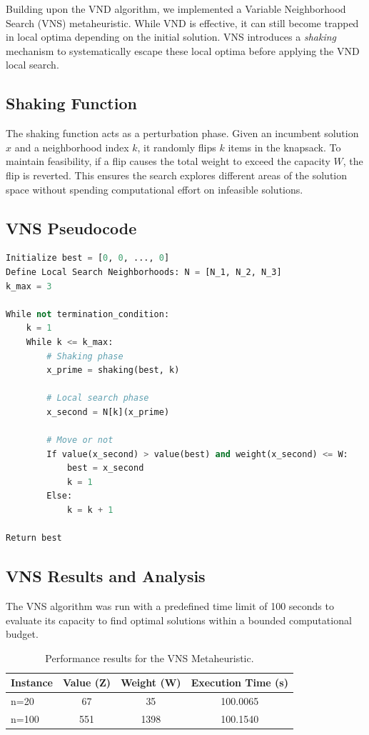 \documentclass[11pt,a4paper]{article}
\begin{document}
Building upon the VND algorithm, we implemented a Variable Neighborhood Search (VNS) metaheuristic. While VND is effective, it can still become trapped in local optima depending on the initial solution. VNS introduces a \textit{shaking} mechanism to systematically escape these local optima before applying the VND local search.

\subsection{Shaking Function}
The shaking function acts as a perturbation phase. Given an incumbent solution $x$ and a neighborhood index $k$, it randomly flips $k$ items in the knapsack. To maintain feasibility, if a flip causes the total weight to exceed the capacity $W$, the flip is reverted. This ensures the search explores different areas of the solution space without spending computational effort on infeasible solutions.

\subsection{VNS Pseudocode}
\begin{lstlisting}[language=Python, numbers=none, frame=none]
Initialize best = [0, 0, ..., 0]
Define Local Search Neighborhoods: N = [N_1, N_2, N_3]
k_max = 3

While not termination_condition:
    k = 1
    While k <= k_max:
        # Shaking phase
        x_prime = shaking(best, k)
        
        # Local search phase
        x_second = N[k](x_prime)
        
        # Move or not
        If value(x_second) > value(best) and weight(x_second) <= W:
            best = x_second
            k = 1
        Else:
            k = k + 1

Return best
\end{lstlisting}

\subsection{VNS Results and Analysis}
The VNS algorithm was run with a predefined time limit of 100 seconds to evaluate its capacity to find optimal solutions within a bounded computational budget.

\begin{table}[htbp]
    \centering
    \begin{tabular}{|l|c|c|c|}
        \hline
        \textbf{Instance} & \textbf{Value (Z)} & \textbf{Weight (W)} & \textbf{Execution Time (s)} \\
        \hline
        n=20  & 67  & 35   & 100.0065 \\
        \hline
        n=100 & 551 & 1398 & 100.1540 \\
        \hline
    \end{tabular}
    \caption{Performance results for the VNS Metaheuristic.}
    \label{tab:vns_results}
\end{table}
\end{document}
